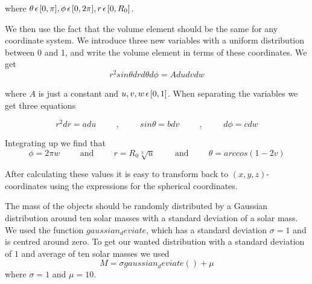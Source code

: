 \documentclass[a4paper,12pt, english]{article}
\begin{document}
where $ \theta \hspace{0.5mm} \epsilon \hspace{0.5mm} [0, \pi], \phi \hspace{0.5mm} \epsilon \hspace{0.5mm} [0, 2\pi], r \hspace{0.5mm} \epsilon \hspace{0.5mm} [0, R_0]$.
 
We then use the fact that the volume element should be the same for any coordinate system. We introduce three new variables with a uniform distribution between 0 and 1, and write the volume element in terms of these coordinates. We get
\[
r^2 sin \theta dr d \theta d \phi = Adudvdw
\]

where $A$ is just a constant and $u, v, w \hspace{0.5mm} \epsilon \hspace{0.5mm} [0,1]$. When separating the variables we get three equations

\[
r^2dr = adu \hspace{1cm}\mathrm{,}\hspace{1cm}
sin \theta = bdv \hspace{1cm}\mathrm{,}\hspace{1cm}
d \phi = cdw
\]

Integrating up we find that
\[
\phi = 2 \pi w \hspace{1cm}\mathrm{and}\hspace{1cm}
r = R_0 \sqrt[3]{u} \hspace{1cm}\mathrm{and}\hspace{1cm}
\theta = arccos(1-2v)
\]

After calculating these values it is easy to transform back to $(x,y,z)$-coordinates using the expressions for the spherical coordinates.

The mass of the objects should be randomly distributed by a Gaussian distribution around ten solar masses with a standard deviation of a solar mass. We used the function $gaussian_deviate$, which has a standard deviation $ \sigma = 1$ and is centred around zero. To get our wanted distribution with a standard deviation of $1$ and average of ten solar masses we used
$$ M = \sigma gaussian_deviate() + \mu $$
where $\sigma = 1$ and $\mu = 10$.
\end{document}
